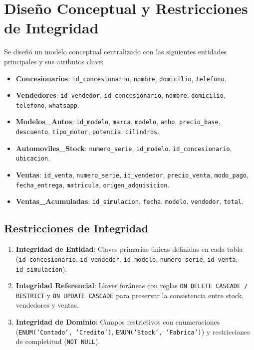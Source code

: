 \documentclass[11pt,a4paper]{article}
\begin{document}
\section{Diseño Conceptual y Restricciones de Integridad}

Se diseñó un modelo conceptual centralizado con las siguientes entidades principales y sus atributos clave:

\begin{itemize}
    \item \textbf{Concesionarios}: \texttt{id\_concesionario}, \texttt{nombre}, \texttt{domicilio}, \texttt{telefono}.
    \item \textbf{Vendedores}: \texttt{id\_vendedor}, \texttt{id\_concesionario}, \texttt{nombre}, \texttt{domicilio}, \texttt{telefono}, \texttt{whatsapp}.
    \item \textbf{Modelos\_Autos}: \texttt{id\_modelo}, \texttt{marca}, \texttt{modelo}, \texttt{anho}, \texttt{precio\_base}, \texttt{descuento}, \texttt{tipo\_motor}, \texttt{potencia}, \texttt{cilindros}.
    \item \textbf{Automoviles\_Stock}: \texttt{numero\_serie}, \texttt{id\_modelo}, \texttt{id\_concesionario}, \texttt{ubicacion}.
    \item \textbf{Ventas}: \texttt{id\_venta}, \texttt{numero\_serie}, \texttt{id\_vendedor}, \texttt{precio\_venta}, \texttt{modo\_pago}, \texttt{fecha\_entrega}, \texttt{matricula}, \texttt{origen\_adquisicion}.
    \item \textbf{Ventas\_Acumuladas}: \texttt{id\_simulacion}, \texttt{fecha}, \texttt{modelo}, \texttt{vendedor}, \texttt{total}.
\end{itemize}

\subsection{Restricciones de Integridad}
\begin{enumerate}
    \item \textbf{Integridad de Entidad}: Claves primarias únicas definidas en cada tabla (\texttt{id\_concesionario}, \texttt{id\_vendedor}, \texttt{id\_modelo}, \texttt{numero\_serie}, \texttt{id\_venta}, \texttt{id\_simulacion}).
    \item \textbf{Integridad Referencial}: Llaves foráneas con reglas \texttt{ON DELETE CASCADE / RESTRICT} y \texttt{ON UPDATE CASCADE} para preservar la consistencia entre stock, vendedores y ventas.
    \item \textbf{Integridad de Dominio}: Campos restrictivos con enumeraciones (\texttt{ENUM('Contado', 'Credito')}, \texttt{ENUM('Stock', 'Fabrica')}) y restricciones de completitud (\texttt{NOT NULL}).
\end{enumerate}
\end{document}
